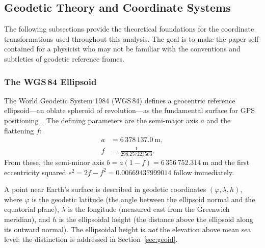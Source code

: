 


\subsection{Geodetic Theory and Coordinate Systems}
\label{sec:geodetic_theory}

The following subsections provide the theoretical foundations for the coordinate transformations used throughout this analysis. The goal is to make the paper self-contained for a physicist who may not be familiar with the conventions and subtleties of geodetic reference frames.

\subsubsection{The WGS\,84 Ellipsoid}
\label{sec:wgs84}

The World Geodetic System 1984 (WGS\,84) defines a geocentric reference ellipsoid---an oblate spheroid of revolution---as the fundamental surface for GPS positioning~\cite{nga2014}. The defining parameters are the semi-major axis $a$ and the flattening $f$:
\begin{align}
a &= 6\,378\,137.0~\text{m}, \label{eq:wgs84_a}\\
f &= \frac{1}{298.257223563}. \label{eq:wgs84_f}
\end{align}
From these, the semi-minor axis $b = a(1-f) = 6\,356\,752.314~\text{m}$ and the first eccentricity squared $e^2 = 2f - f^2 = 0.00669437999014$ follow immediately.

A point near Earth's surface is described in geodetic coordinates $(\varphi, \lambda, h)$, where $\varphi$ is the geodetic latitude (the angle between the ellipsoid normal and the equatorial plane), $\lambda$ is the longitude (measured east from the Greenwich meridian), and $h$ is the ellipsoidal height (the distance above the ellipsoid along its outward normal). The ellipsoidal height is \emph{not} the elevation above mean sea level; the distinction is addressed in Section~\ref{sec:geoid}.

